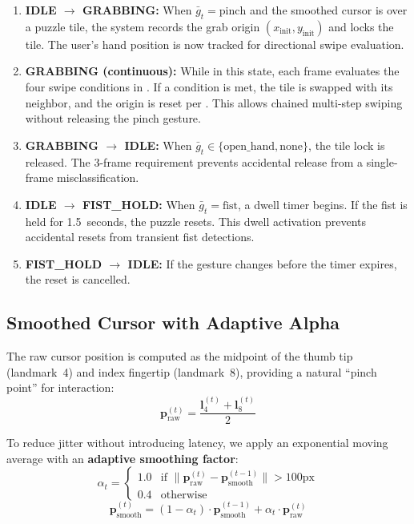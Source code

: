 \documentclass[11pt,a4paper]{article}
\begin{document}
\begin{enumerate}
    \item \textbf{IDLE $\to$ GRABBING:} When $\bar{g}_t = \text{pinch}$ and the smoothed cursor is over a puzzle tile, the system records the grab origin $(x_{\text{init}}, y_{\text{init}})$ and locks the tile. The user's hand position is now tracked for directional swipe evaluation.

    \item \textbf{GRABBING (continuous):} While in this state, each frame evaluates the four swipe conditions in . If a condition is met, the tile is swapped with its neighbor, and the origin is reset per . This allows chained multi-step swiping without releasing the pinch gesture.

    \item \textbf{GRABBING $\to$ IDLE:} When $\bar{g}_t \in \{\text{open\_hand}, \text{none}\}$, the tile lock is released. The 3-frame requirement prevents accidental release from a single-frame misclassification.

    \item \textbf{IDLE $\to$ FIST\_HOLD:} When $\bar{g}_t = \text{fist}$, a dwell timer begins. If the fist is held for 1.5~seconds, the puzzle resets. This dwell activation prevents accidental resets from transient fist detections.

    \item \textbf{FIST\_HOLD $\to$ IDLE:} If the gesture changes before the timer expires, the reset is cancelled.
\end{enumerate}

\subsection{Smoothed Cursor with Adaptive Alpha}
\label{sec:cursor}

The raw cursor position is computed as the midpoint of the thumb tip (landmark~4) and index fingertip (landmark~8), providing a natural ``pinch point'' for interaction:
\begin{equation}
    \mathbf{p}_{\text{raw}}^{(t)} = \frac{\mathbf{l}_4^{(t)} + \mathbf{l}_8^{(t)}}{2}
    \label{eq:rawcursor}
\end{equation}

To reduce jitter without introducing latency, we apply an exponential moving average with an \textbf{adaptive smoothing factor}:
\begin{equation}
    \alpha_t =
    \begin{cases}
        1.0 & \text{if } \|\mathbf{p}_{\text{raw}}^{(t)} - \mathbf{p}_{\text{smooth}}^{(t-1)}\| > 100\text{px} \\
        0.4 & \text{otherwise}
    \end{cases}
    \label{eq:adaptive_alpha}
\end{equation}
\begin{equation}
    \mathbf{p}_{\text{smooth}}^{(t)} = (1 - \alpha_t) \cdot \mathbf{p}_{\text{smooth}}^{(t-1)} + \alpha_t \cdot \mathbf{p}_{\text{raw}}^{(t)}
    \label{eq:ema}
\end{equation}
\end{document}
